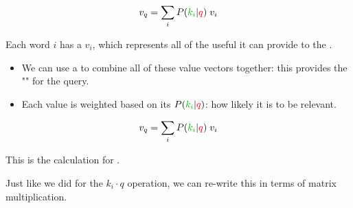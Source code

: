         \begin{equation}
            v_{q} = 
                \sum_i P(\grn{k_i}|\red{q}) \; v_{i}
        \end{equation}

        \begin{kequation}
            Each word $i$ has a  $v_i$, which represents all of the useful  it can provide to the .

            \begin{itemize}
                \item We can use a  to combine all of these value vectors together: this provides the "" for the query.

                \item Each value is weighted based on its  $P(\grn{k_i}|\red{q}) $: how likely it is to be relevant.
            \end{itemize}

            \begin{equation*}
                v_{q} = 
                    \sum_i P(\grn{k_i}|\red{q}) \; v_{i}
            \end{equation*}

            This is the calculation for .
        \end{kequation}

        Just like we did for the $k_i \cdot q$ operation, we can re-write this in terms of matrix multiplication.

